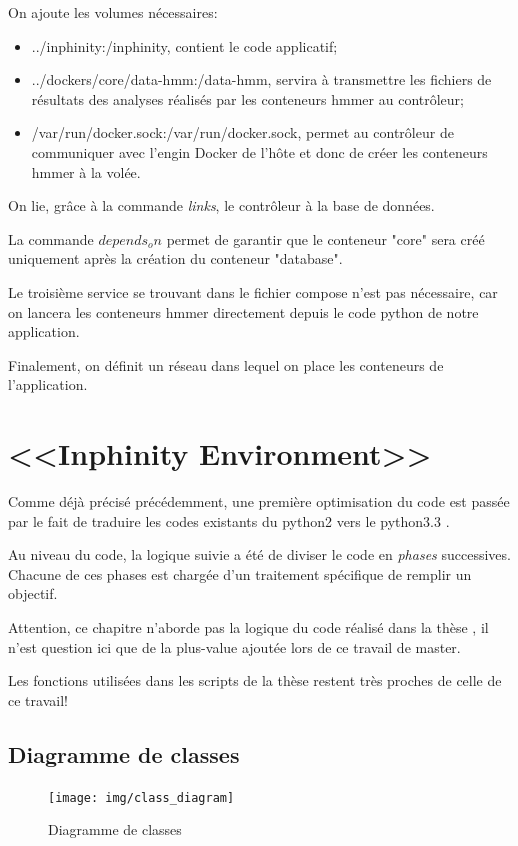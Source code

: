 On ajoute les volumes nécessaires:

\begin{itemize}
\item ../inphinity:/inphinity, contient le code applicatif;
\item ../dockers/core/data-hmm:/data-hmm, servira à transmettre les fichiers de résultats des analyses réalisés par les conteneurs hmmer au contrôleur;
\item /var/run/docker.sock:/var/run/docker.sock, permet au contrôleur de communiquer avec l'engin Docker de l'hôte et donc de créer les conteneurs hmmer à la volée.
\end{itemize}

On lie, grâce à la commande \emph{links}, le contrôleur à la base de données.

La commande \emph{$depends_on$} permet de garantir que le conteneur "core" sera créé uniquement après la création du conteneur "database".

Le troisième service se trouvant dans le fichier compose n'est pas nécessaire, car on lancera les conteneurs hmmer directement depuis le code python de notre application. 

Finalement, on définit un réseau dans lequel on place les conteneurs de l'application.

\section{<<Inphinity Environment>>}

Comme déjà précisé précédemment, une première optimisation du code est passée par le fait de traduire les codes existants du python2 vers le python3.3 .

Au niveau du code, la logique suivie a été de diviser le code en \emph{phases} successives. Chacune de ces phases est chargée d'un traitement spécifique de remplir un objectif.

Attention, ce chapitre n'aborde pas la logique du code réalisé dans la thèse \thLeite , il n'est question ici que de la plus-value ajoutée lors de ce travail de master.

Les fonctions utilisées dans les scripts de la thèse \thLeite restent très proches de celle de ce travail!

\subsection{Diagramme de classes}
\begin{figure}[H] 
\centering 
\texttt{[image: img/class\_diagram]} 
\caption[classdiagram]{Diagramme de classes}
\label{fig:classdiagram} 
\end{figure}


